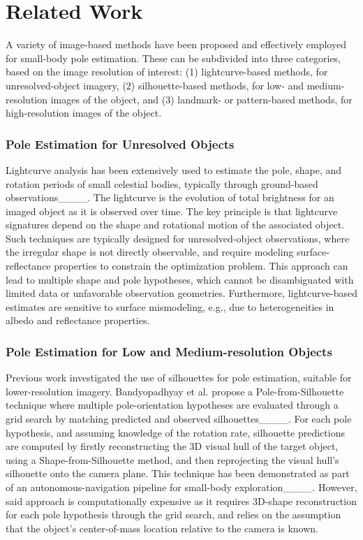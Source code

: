 \section{Related Work}
A variety of image-based methods have been proposed and effectively employed for small-body pole estimation. These can be subdivided into three categories, based on the image resolution of interest: (1) lightcurve-based methods, for unresolved-object imagery, (2) silhouette-based methods, for low- and medium-resolution images of the object, and (3) landmark- or pattern-based methods, for high-resolution images of the object.

\subsubsection{Pole Estimation for Unresolved Objects}
Lightcurve analysis has been extensively used to estimate the pole, shape, and rotation periods of small celestial bodies, typically through ground-based observations____. The lightcurve is the evolution of total brightness for an imaged object as it is observed over time. The key principle is that lightcurve signatures depend on the shape and rotational motion of the associated object. Such techniques are typically designed for unresolved-object observations, where the irregular shape is not directly observable, and require modeling surface-reflectance properties to constrain the optimization problem. This approach can lead to multiple shape and pole hypotheses, which cannot be disambiguated with limited data or unfavorable observation geometries. Furthermore, lightcurve-based estimates are sensitive to surface mismodeling, e.g., due to heterogeneities in albedo and reflectance properties.

\subsubsection{Pole Estimation for Low and Medium-resolution Objects}

Previous work investigated the use of silhouettes for pole estimation, suitable for lower-resolution imagery. Bandyopadhyay et al. propose a Pole-from-Silhouette technique where multiple pole-orientation hypotheses are evaluated through a grid search by matching predicted and observed silhouettes____. For each pole hypothesis, and assuming knowledge of the rotation rate, silhouette predictions are computed by firstly reconstructing the 3D visual hull of the target object, using a Shape-from-Silhouette method, and then reprojecting the visual hull's silhouette onto the camera plane. This technique has been demonstrated as part of an autonomous-navigation pipeline for small-body exploration____. However, said approach is computationally expensive as it requires 3D-shape reconstruction for each pole hypothesis through the grid search, and relies on the assumption that the object's center-of-mass location relative to the camera is known.

